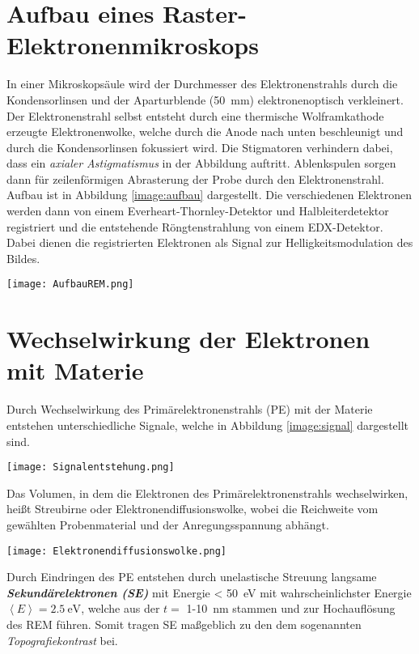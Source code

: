 \section{Aufbau eines Raster-Elektronenmikroskops}
\label{sec:aufbau}
In einer Mikroskopsäule wird der Durchmesser des Elektronenstrahls durch die Kondensorlinsen und der Aparturblende (\SI{50}{\milli\metre}) elektronenoptisch verkleinert. Der Elektronenstrahl selbst entsteht durch eine thermische Wolframkathode erzeugte Elektronenwolke, welche durch die Anode nach unten beschleunigt und durch die Kondensorlinsen fokussiert wird. Die Stigmatoren verhindern dabei, dass ein \textit{axialer Astigmatismus} in der Abbildung auftritt. Ablenkspulen sorgen dann  für zeilenförmigen Abrasterung der Probe durch den Elektronenstrahl. \citep{RasterEM} Aufbau ist in Abbildung \ref{image:aufbau} dargestellt. Die verschiedenen Elektronen werden dann von einem Everheart-Thornley-Detektor und Halbleiterdetektor registriert und die entstehende Röngtenstrahlung von einem EDX-Detektor. Dabei dienen die registrierten Elektronen als Signal zur Helligkeitsmodulation des Bildes. \citep{RasterEM}
\begin{center}
    \texttt{[image: AufbauREM.png]}
    \label{image:aufbau}
\end{center}

\section{Wechselwirkung der Elektronen mit Materie}
\label{sec:elektrons}
Durch Wechselwirkung des Primärelektronenstrahls (PE) mit der Materie entstehen unterschiedliche Signale, welche in Abbildung \ref{image:signal} dargestellt sind.
\begin{center}
    \texttt{[image: Signalentstehung.png]}
    \label{image:signal}
\end{center}
Das Volumen, in dem die Elektronen des Primärelektronenstrahls wechselwirken, heißt Streubirne oder Elektronendiffusionswolke, wobei die Reichweite vom gewählten Probenmaterial und der Anregungsspannung abhängt. 
\begin{center}
    \texttt{[image: Elektronendiffusionswolke.png]}
    \label{image:wolke}
\end{center}
Durch Eindringen des PE entstehen durch unelastische Streuung langsame \textbf{\textit{Sekundärelektronen (SE)}} mit Energie < \SI{50}{\electronvolt} mit wahrscheinlichster Energie $\left\langle E\right\rangle=\SI{2,5}{\electronvolt}$, welche aus der $t =$ 1-\SI{10}{\nano\metre} stammen und zur Hochauflösung des REM führen. \citep{RasterEM} Somit tragen SE maßgeblich zu den dem sogenannten \textit{Topografiekontrast} bei. \citep{WikipolyREM}\\


